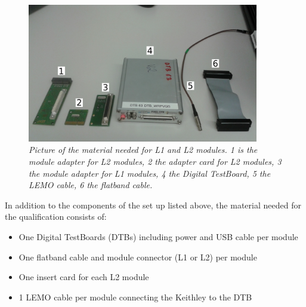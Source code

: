 \documentclass[a4paper,12pt,twoside]{article}
\begin{document}
\begin{figure} [h!] \centering 
\includegraphics[width=0.9\textwidth, angle=0] {./Figures/Material.jpg}
\caption{\em  \label{Material}
Picture of the material needed for L1 and L2 modules. 1 is the module adapter for L2 modules, 2 the adapter card for L2 modules, 3 the module adapter for L1 modules, 4 the Digital TestBoard, 5 the LEMO cable, 6 the flatband cable.}
\end{figure}

In addition to the components of the set up listed above, the material needed for the qualification consists of:

\begin{itemize}
\item One Digital TestBoards (DTBs) including power and USB cable per module
\item One flatband cable and module connector (L1 or L2) per module
\item One insert card for each L2 module
\item 1 LEMO cable per module connecting the Keithley to the DTB
\end{itemize}
\end{document}
